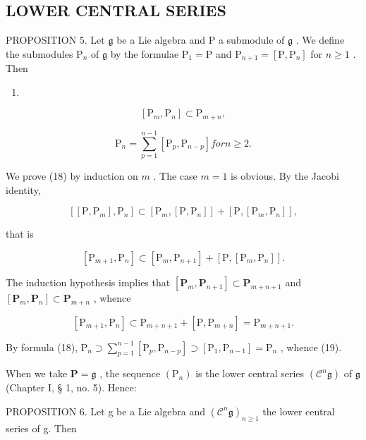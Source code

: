 \subsection{LOWER CENTRAL SERIES}

PROPOSITION 5. Let \(\mathfrak{g}\) be a Lie algebra and \(\mathrm{P}\) a submodule of \(\mathfrak{g}\) . We define the submodules \(\mathrm{P}_n\) of \(\mathfrak{g}\) by the formulae \(\mathrm{P}_1 = \mathrm{P}\) and \(\mathrm{P}_{n+1} = [\mathrm{P},\mathrm{P}_n]\) for \(n\geqslant 1\) . Then

\begin{enumerate}
\def\labelenumi{(\arabic{enumi})}
\setcounter{enumi}{17}
\tightlist
\item
\end{enumerate}

\[
[ \mathrm{P} _ {m}, \mathrm{P} _ {n} ] \subset \mathrm{P} _ {m + n},\tag{18}
\]

\[
\mathrm{P} _ {n} = \sum_ {p = 1} ^ {n - 1} \left[ \mathrm{P} _ {p}, \mathrm{P} _ {n - p} \right] for n \geqslant 2.\tag{19}
\]

We prove (18) by induction on \(m\) . The case \(m = 1\) is obvious. By the Jacobi identity,

\[
[ [ \mathrm{P}, \mathrm{P} _ {m} ], \mathrm{P} _ {n} ] \subset [ \mathrm{P} _ {m}, [ \mathrm{P}, \mathrm{P} _ {n} ] ] + [ \mathrm{P}, [ \mathrm{P} _ {m}, \mathrm{P} _ {n} ] ],
\]

that is

\[
[ \mathrm{P} _ {m + 1}, \mathrm{P} _ {n} ] \subset [ \mathrm{P} _ {m}, \mathrm{P} _ {n + 1} ] + [ \mathrm{P}, [ \mathrm{P} _ {m}, \mathrm{P} _ {n} ] ].
\]

The induction hypothesis implies that \([\mathbf{P}_m, \mathbf{P}_{n+1}] \subset \mathbf{P}_{m+n+1}\) and \([\mathbf{P}_m, \mathbf{P}_n] \subset \mathbf{P}_{m+n}\) , whence

\[
[ \mathrm{P} _ {m + 1}, \mathrm{P} _ {n} ] \subset \mathrm{P} _ {m + n + 1} + [ \mathrm{P}, \mathrm{P} _ {m + n} ] = \mathrm{P} _ {m + n + 1}.
\]

By formula (18), \(\mathrm{P}_n\supset \sum_{p = 1}^{n - 1}[\mathrm{P}_p,\mathrm{P}_{n - p}]\supset [\mathrm{P}_1,\mathrm{P}_{n - 1}] = \mathrm{P}_n\) , whence (19).

When we take \(\mathbf{P} = \mathfrak{g}\) , the sequence \((\mathrm{P}_n)\) is the lower central series \((\mathcal{C}^n\mathfrak{g})\) of \(\mathfrak{g}\) (Chapter I, § 1, no. 5). Hence:

PROPOSITION 6. Let g be a Lie algebra and \((\mathcal{C}^{n}\mathfrak{g})_{n\geqslant 1}\) the lower central series of g. Then

